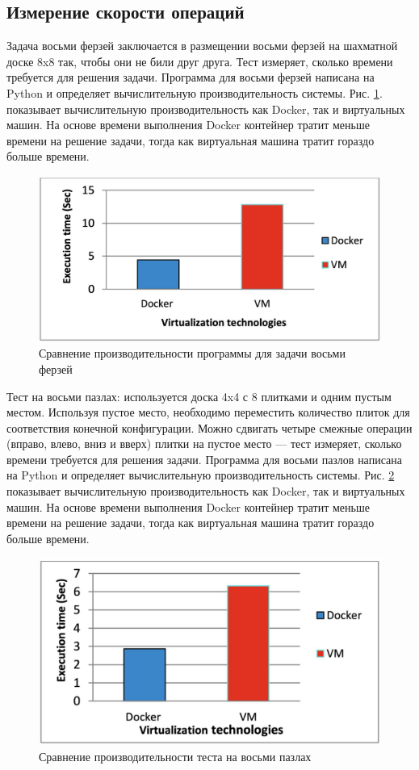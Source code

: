 \documentclass{mirea}
\begin{document}
	\subsection{Измерение скорости операций}
	
	Задача восьми ферзей заключается в размещении восьми ферзей на шахматной доске 8x8 так, чтобы они не били друг друга. Тест измеряет, сколько времени требуется для решения задачи. Программа для восьми ферзей написана на Python и определяет вычислительную производительность системы. Рис. \ref{fig:pic9}. показывает вычислительную производительность как Docker, так и виртуальных машин. На основе времени выполнения Docker контейнер тратит меньше времени на решение задачи, тогда как виртуальная машина тратит гораздо больше времени.
	
	\begin{figure}[H]
		\centering
		\includegraphics[width=.6\textwidth]{img9}
		\parskip=6pt
		\caption{Сравнение производительности программы для задачи восьми ферзей}
		\label{fig:pic9}
	\end{figure}

	Тест на восьми пазлах: используется доска 4x4 с 8 плитками и одним пустым местом. Используя пустое место, необходимо переместить количество плиток для соответствия конечной конфигурации. Можно сдвигать четыре смежные операции (вправо, влево, вниз и вверх) плитки на пустое место — тест измеряет, сколько времени требуется для решения задачи. Программа для восьми пазлов написана на Python и определяет вычислительную производительность системы. Рис. \ref{fig:pic10} показывает вычислительную производительность как Docker, так и виртуальных машин. На основе времени выполнения Docker контейнер тратит меньше времени на решение задачи, тогда как виртуальная машина тратит гораздо больше времени.
	
	\begin{figure}[H]
		\centering
		\includegraphics[width=.6\textwidth]{img10}
		\parskip=6pt
		\caption{Сравнение производительности теста на восьми пазлах}
		\label{fig:pic10}
	\end{figure}
\end{document}
